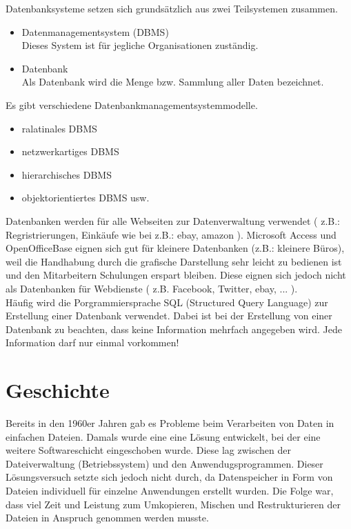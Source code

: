 \documentclass[12pt,a4paper]{report}
\begin{document}
Datenbanksysteme setzen sich grundsätzlich aus zwei Teilsystemen zusammen.

\begin{itemize}
\item Datenmanagementsystem (DBMS)\\
Dieses System ist für jegliche Organisationen zuständig.
\item Datenbank\\
Als Datenbank wird die Menge bzw. Sammlung aller Daten bezeichnet.
\end{itemize} 

Es gibt verschiedene Datenbankmanagementsystemmodelle.
\begin{itemize}
\item ralatinales DBMS
\item netzwerkartiges DBMS
\item hierarchisches DBMS
\item objektorientiertes DBMS usw.
\end{itemize}

Datenbanken werden für alle Webseiten zur Datenverwaltung verwendet ( z.B.: Regristrierungen, Einkäufe wie bei z.B.: ebay, amazon ).
Microsoft Access und OpenOfficeBase eignen sich gut für kleinere Datenbanken (z.B.: kleinere Büros), weil die Handhabung durch die grafische Darstellung sehr leicht zu bedienen ist und den Mitarbeitern Schulungen erspart bleiben.
Diese eignen sich jedoch nicht als Datenbanken für Webdienste ( z.B. Facebook, Twitter, ebay, ... ).\\

Häufig wird die Porgrammiersprache SQL (Structured Query Language) zur Erstellung einer Datenbank verwendet. Dabei ist bei der Erstellung von einer Datenbank zu beachten, dass keine Information mehrfach angegeben wird. Jede Information darf nur einmal vorkommen!

\section{Geschichte}
Bereits in den 1960er Jahren gab es Probleme beim Verarbeiten von Daten in einfachen Dateien. Damals wurde eine eine Lösung entwickelt, bei der eine weitere Softwareschicht eingeschoben wurde. Diese lag zwischen der Dateiverwaltung (Betriebssystem) und den Anwendugsprogrammen. Dieser Lösungsversuch setzte sich jedoch nicht durch, da Datenspeicher in Form von Dateien individuell für einzelne Anwendungen erstellt wurden. Die Folge war, dass viel Zeit und Leistung zum Umkopieren, Mischen und Restrukturieren der Dateien in Anspruch genommen werden musste.\\
\end{document}
